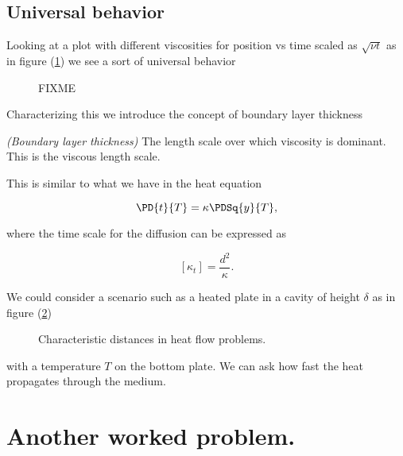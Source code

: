 \subsection{Universal behavior}

Looking at a plot with different viscosities for position vs time scaled as $\sqrt{\nu t}$ as in figure (\ref{fig:continuumL17:continuumL17Fig4}) we see a sort of universal behavior

\begin{figure}[htp]
   \centering
   \def\svgwidth{0.6\columnwidth}
   
   \caption{FIXME}\label{fig:continuumL17:continuumL17Fig4}
\end{figure}

Characterizing this we introduce the concept of boundary layer thickness

\begin{definition}
\emph{(Boundary layer thickness)}
\label{dfn:continuumL17:200}
The length scale over which viscosity is dominant.  This is the viscous length scale.
\end{definition}

This is similar to what we have in the heat equation 

\begin{equation}\label{eqn:continuumL17:220}
\PD{t}{T} = \kappa \PDSq{y}{T},
\end{equation}

where the time scale for the diffusion can be expressed as

\begin{equation}\label{eqn:continuumL17:240}
[\kappa_t] = \frac{d^2}{\kappa}.
\end{equation}

We could consider a scenario such as a heated plate in a cavity of height $\delta$ as in figure (\ref{fig:continuumL17:continuumL17Fig5})
\begin{figure}[htp]
   \centering
   \def\svgwidth{0.5\columnwidth}
   
   \caption{Characteristic distances in heat flow problems.}\label{fig:continuumL17:continuumL17Fig5}
\end{figure}

with a temperature $T$ on the bottom plate.  We can ask how fast the heat propagates through the medium.

\section{Another worked problem.}

